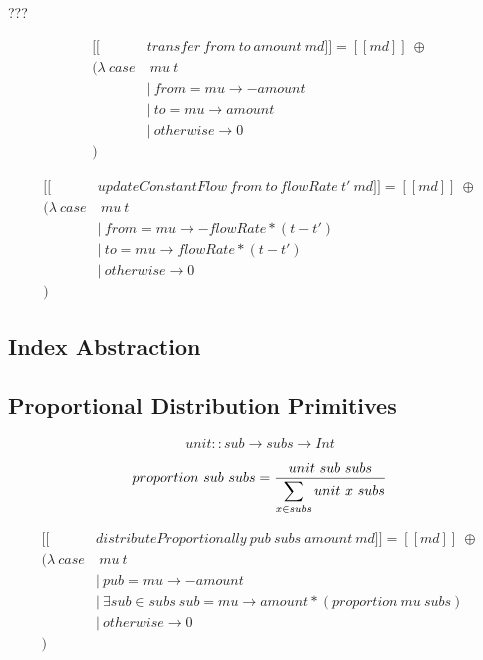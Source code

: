 ???

\begin{equation}\label{sem_transfer}
    \begin{split}
        [\![&transfer\ from\ to\ amount\ md]\!] = [\![md]\!]\ \oplus \\
        (\lambda\ case&\ mu\ t \\
        &|\ from = mu \rightarrow -amount \\
        &|\ to   = mu \rightarrow amount \\
        &|\ otherwise \rightarrow 0 \\
        )
    \end{split}
\end{equation}

\begin{equation}\label{sem_updateConstantFlow}
    \begin{split}
        [\![&updateConstantFlow\ from\ to\ flowRate\ t'\ md]\!] = [\![md]\!]\ \oplus \\
        (\lambda\ case&\ mu\ t \\
        &|\ from = mu \rightarrow -flowRate * (t - t') \\
        &|\ to   = mu \rightarrow flowRate  * (t - t') \\
        &|\ otherwise \rightarrow 0 \\
        )
    \end{split}
\end{equation}

\subsection{Index Abstraction}


\subsection{Proportional Distribution Primitives}

\begin{equation}
    unit :: sub \rightarrow subs \rightarrow Int
\end{equation}

\begin{equation}
    proportion\ sub\ subs = {{ unit\ sub\ subs } \over { \displaystyle \sum_{x \in subs} unit\ x\ subs }}
\end{equation}

\begin{equation}\label{sem_distributeProportionally}
    \begin{split}
        [\![&distributeProportionally\ pub\ subs\ amount\ md]\!] = [\![md]\!]\ \oplus \\
        (\lambda\ case&\ mu\ t \\
        &|\ pub = mu \rightarrow -amount \\
        &|\ \exists sub \in subs\ { sub = mu } \rightarrow amount * (proportion\ mu\ subs) \\
        &|\ otherwise \rightarrow 0 \\
        )
    \end{split}
\end{equation}

